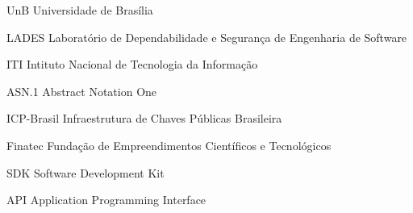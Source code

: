 \begin{siglas}
  \item [UnB] Universidade de Brasília
  \item [LADES] Laboratório de Dependabilidade e Segurança de Engenharia de Software
  \item [ITI] Intituto Nacional de Tecnologia da Informação
  \item [ASN.1] Abstract Notation One
  \item [ICP-Brasil] Infraestrutura de Chaves Públicas Brasileira
  \item [Finatec] Fundação de Empreendimentos Científicos e Tecnológicos
  \item [SDK] Software Development Kit
  \item [API] Application Programming Interface
\end{siglas}
